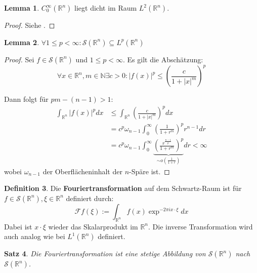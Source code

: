 \documentclass{article}
\newcommand{\R}[0]{\mathbb{R}}
\newcommand{\N}[0]{\mathbb{N}}
\newcommand{\F}[0]{\mathcal{F}}
\newcommand{\Ssp}[0]{\mathcal{S}}
\newcommand{\C}[0]{C^{\infty}_0}
\theoremstyle{plain}
\newtheorem{thm}{Satz}[section]
\theoremstyle{definition}
\newtheorem{defin}[thm]{Definition}
\newtheorem{lemma}[thm]{Lemma}
\begin{document}
\begin{lemma}\label{lem:C0dense}
    $\C(\R^n)$ liegt dicht im Raum $L^2(\R^n)$.
\end{lemma}

\begin{proof}
    Siehe \cite[S. 115, Satz 2.15(3)]{alt2016linear}.
\end{proof}

\begin{lemma}\label{lem:slp}
    $\forall 1 \leq p < \infty: \Ssp(\R^n) \subseteq L^p(\R^n)$
\end{lemma}

\begin{proof}\cite[S. 230f.]{werner2006funktionalanalysis}
    Sei $f \in \Ssp(\R^n)$ und $1 \leq p < \infty$. Es gilt die Abschätzung:
    \begin{equation}
        \forall x\in \R^n, m\in \N\exists c>0: |f(x)|^p \leq \left(\frac{c}{1 + |x|^m}\right)^p
    \end{equation}

    Dann folgt für $pm - (n-1) > 1$:
    \begin{align*}
        \int_{\R^n} |f(x)|^p dx &\leq \int_{\R^n} \left(\frac{c}{1 + |x|^m}\right)^p dx \\
        &= c^p \omega_{n - 1} \int_{0}^{\infty} \left(\frac{1}{1 + r^m}\right)^pr^{n - 1}dr \\
        &= c^p \omega_{n - 1} \int_{0}^{\infty} \underbrace{\left(\frac{r^{\frac{n-1}{p}}}{1 + r^m}\right)^p}_{\sim o(\frac{1}{1+r})} dr < \infty
    \end{align*}
    wobei $\omega_{n-1}$ der Oberflächeninhalt der $n$-Späre ist.
\end{proof}

\begin{defin}
    Die \textbf{Fouriertransformation} auf dem Schwartz-Raum ist für $f \in \Ssp(\R^n), \xi \in \R^n$ definiert durch:
    \begin{equation}
        \F f(\xi) := \int_{\R^n} f(x) \exp^{-2\pi i x \cdot \xi} dx
    \end{equation}
    Dabei ist $x \cdot \xi$ wieder das Skalarprodukt im $\R^n$.
    Die inverse Transformation wird auch analog wie bei $L^1(\R^n)$ definiert.
\end{defin}

\begin{thm}
    Die Fouriertransformation ist eine stetige Abbildung von $\Ssp(\R^n)$ nach $\Ssp(\R^n)$.
\end{thm}
\end{document}
